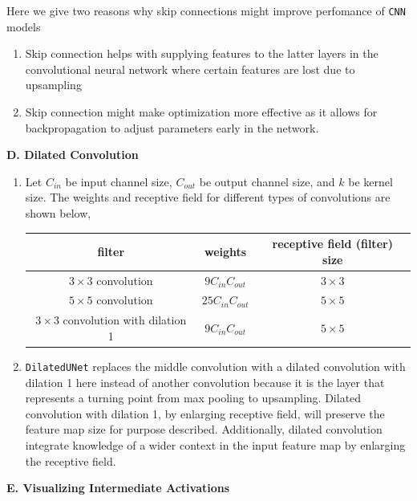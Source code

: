 \documentclass[11pt]{article}
\begin{document}
\begin{enumerate}
\begin{enumerate}
    \end{enumerate}
    Here we give two reasons why skip connections might improve perfomance of \texttt{CNN} models 
    \begin{enumerate}
        \item Skip connection helps with supplying features to the latter layers in the convolutional neural network where certain features are lost due to upsampling
        \item Skip connection might make optimization more effective as it allows for backpropagation to adjust parameters early in the network. 
    \end{enumerate}
\end{enumerate}

\textbf{D. Dilated Convolution}


\begin{enumerate}
    \item Let $C_{in}$ be input channel size, $C_{out}$ be output channel size, and $k$ be kernel size. The weights and receptive field for different types of convolutions are shown below,
    \begin{center}
        \begin{tabular}{c | c c}
            filter & weights & receptive field (filter) size \\
            \hline 
            $3\times 3$ convolution & $9C_{in}C_{out}$ & $3\times 3$ \\
            $5\times 5$ convolution & $25C_{in}C_{out}$ & $5\times 5$ \\ 
            $3\times 3$ convolution with dilation 1 & $9C_{in}C_{out}$ & $5\times 5$ \\
        \end{tabular}
    \end{center}
    \item \texttt{DilatedUNet} replaces the middle convolution with a dilated convolution with dilation 1 here instead of another convolution because it is the layer that represents a turning point from max pooling to upsampling. Dilated convolution with dilation 1, by enlarging receptive field, will preserve the feature map size for purpose described. Additionally, dilated convolution integrate knowledge of a wider context in the input feature map by enlarging the receptive field.
\end{enumerate}


\textbf{E. Visualizing Intermediate Activations}
\end{document}
